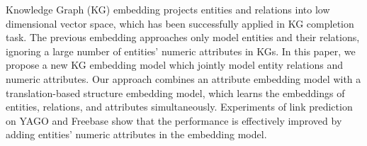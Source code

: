 Knowledge Graph (KG) embedding projects entities and relations into low dimensional vector space, which has been successfully applied in KG completion task. The previous embedding approaches only model entities and their relations, ignoring a large number of entities' numeric attributes in KGs. In this paper, we propose a new KG embedding model which jointly model entity relations and numeric attributes. Our approach combines an attribute embedding model with a translation-based structure embedding model, which learns the embeddings of entities, relations, and attributes simultaneously. Experiments of link prediction on YAGO and Freebase show that the performance is effectively improved by adding entities' numeric attributes in the embedding model.
